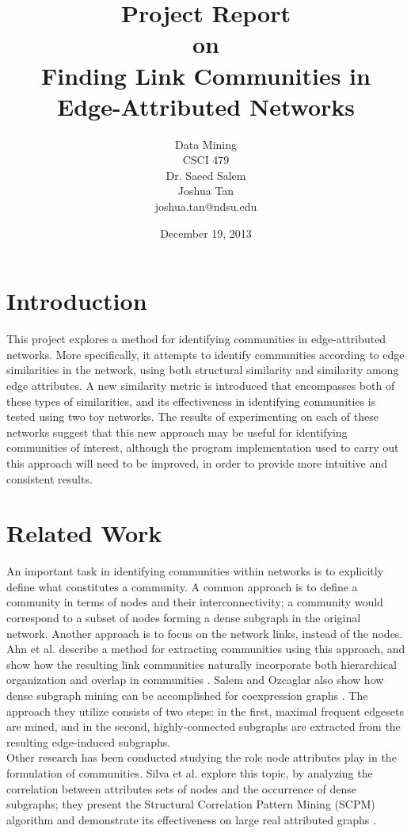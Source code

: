 \documentclass{report} %
\title{Project Report\\[0.5em]{\Large on}\\[0.5em]Finding Link Communities in Edge-Attributed Networks}
\author{Data Mining\\CSCI 479\\Dr. Saeed Salem\\[1em] Joshua Tan\\joshua.tan@ndsu.edu}
\date{December 19, 2013}
\begin{document}
\maketitle

\section*{Introduction}

This project explores a method for identifying communities in edge-attributed networks. More specifically, it attempts to identify communities according to edge similarities in the network, using both structural similarity and similarity among edge attributes. A new similarity metric is introduced that encompasses both of these types of similarities, and its effectiveness in identifying communities is tested using two toy networks. The results of experimenting on each of these networks suggest that this new approach may be useful for identifying communities of interest, although the program implementation used to carry out this approach will need to be improved, in order to provide more intuitive and consistent results.

\section*{Related Work}

An important task in identifying communities within networks is to explicitly define what constitutes a community. A common approach is to define a community in terms of nodes and their interconnectivity; a community would correspond to a subset of nodes forming a dense subgraph in the original network. Another approach is to focus on the network links, instead of the nodes. Ahn et al. describe a method for extracting communities using this approach, and show how the resulting link communities naturally incorporate both hierarchical organization and overlap in communities \cite{ahn-lehmann-link-communities-nature-2010}. Salem and Ozcaglar also show how dense subgraph mining can be accomplished for coexpression graphs \cite{Salem:2013:MMF:2500863.2500869}. The approach they utilize consists of two steps: in the first, maximal frequent edgesets are mined, and in the second, highly-connected subgraphs are extracted from the resulting edge-induced subgraphs.\\

Other research has been conducted studying the role node attributes play in the formulation of communities. Silva et al. explore this topic, by analyzing the correlation between attributes sets of nodes and the occurrence of dense subgraphs; they present the Structural Correlation Pattern Mining (SCPM) algorithm and demonstrate its effectiveness on large real attributed graphs \cite{DBLP:journals/corr/abs-1201-6568}.
\end{document}
